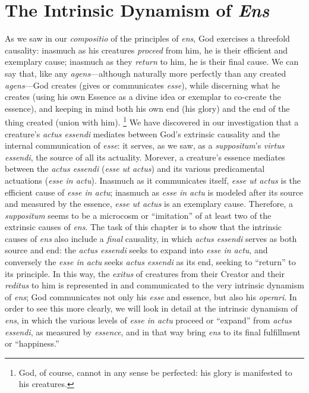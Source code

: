 
\chapter{The Intrinsic Dynamism of \emph{Ens}}
\label{chap:dynamism}

As we saw in our \emph{compositio} of the principles of \emph{ens}, God exercises a threefold causality: inasmuch as his creatures \emph{proceed} from him, he is their efficient and exemplary cause; inasmuch as they \emph{return} to him, he is their final cause. We can say that, like any \emph{agens}—although naturally more perfectly than any created \emph{agens}—God creates (gives or communicates \emph{esse}), while discerning what he creates (using his own Essence as a divine idea or exemplar to co-create the essence), and keeping in mind both his own end (his glory) and the end of the thing created (union with him).%
%
\footnote{God, of course, cannot in any sense be perfected: his glory is manifested to his creatures.}
%
We have discovered in our investigation that a creature’s \emph{actus essendi} mediates between God’s extrinsic causality and the internal communication of \emph{esse}: it serves, as we saw, as a \emph{suppositum}’s \emph{virtus essendi}, the source of all its actuality. Morever, a creature’s essence mediates between the \emph{actus essendi} (\emph{esse ut actus}) and its various predicamental actuations (\emph{esse in actu}).  Inasmuch as it communicates itself, \emph{esse ut actus} is the efficient cause of \emph{esse in actu}; inasmuch as \emph{esse in actu} is modeled after its source and measured by the essence, \emph{esse ut actus} is an exemplary cause.  Therefore, a \emph{suppositum} seems to be a microcosm or “imitation” of at least two of the extrinsic causes of \emph{ens}. The task of this chapter is to show that the intrinsic causes of \emph{ens} also include a \emph{final} causality, in which \emph{actus essendi} serves as both source and end: the \emph{actus essendi} seeks to expand into \emph{esse in actu}, and conversely the \emph{esse in actu} seeks \emph{actus essendi} as its end, seeking to “return” to its principle. In this way, the \emph{exitus} of creatures from their Creator and their \emph{reditus} to him is represented in and communicated to the very intrinsic dynamism of \emph{ens}; God communicates not only his \emph{esse} and essence, but also his \emph{operari}. In order to see this more clearly, we will look in detail at the intrinsic dynamism of \emph{ens}, in which the various levels of \emph{esse in actu} proceed or “expand” from \emph{actus essendi}, as measured by \emph{essence}, and in that way bring \emph{ens} to its final fulfillment or “happiness.” 

